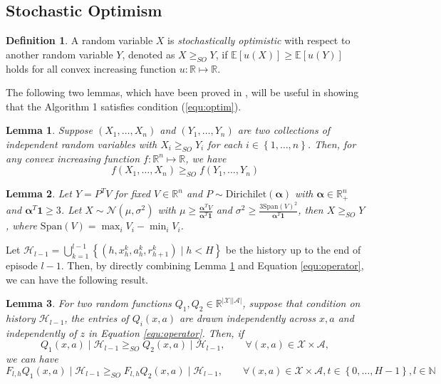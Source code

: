 \documentclass[letterpaper]{article} %
\newcommand{\Sp}[1]{\left(#1\right)}
\newcommand{\Mp}[1]{\left[#1\right]}
\newcommand{\Bp}[1]{\left\{#1\right\}}
\newcommand{\abs}[1]{\left|#1\right|}
\newcommand{\E}{\mathbb{E}}
\newcommand{\R}{\mathbb{R}}
\newtheorem{lemma}{Lemma}
\theoremstyle{definition}
\newtheorem{definition}{Definition}
\begin{document}
\subsection{Stochastic Optimism}
\begin{definition}
	A random variable $X$ is \textit{stochastically optimistic} with respect to another random variable $Y$, denoted as $X\geq_{SO}Y$, if $\E\Mp{u\Sp{X}}\geq\E\Mp{u\Sp{Y}}$ holds for all convex increasing function $u:\R\mapsto\R$.
\end{definition}

The following two lemmas, which have been proved in \cite{osband2017deep}, will be useful in showing that the Algorithm 1 satisfies condition (\ref{equ:optim}).

\begin{lemma}
	\label{lemma:conv}
	Suppose $\Sp{X_1, \dots, X_n}$ and $\Sp{Y_1, \dots, Y_n}$ are two collections of independent random variables with $X_i\geq_{SO}Y_i$ for each $i\in\Bp{1, \dots, n}$. Then, for any convex increasing function $f:\R^n\mapsto\R$, we have
	$$f\Sp{X_1, \dots, X_n}\geq_{SO} f\Sp{Y_1, \dots, Y_n}$$
\end{lemma}

\begin{lemma}
	\label{lemma:dir_so}
	Let $Y=P^TV$ for fixed $V\in\R^n$ and $P\sim\mathrm{Dirichilet}\Sp{\bm{\alpha}}$ with $\bm{\alpha}\in\R^n_{+}$ and $\bm{\alpha}^T\bm{1}\geq 3$. Let $X\sim\mathcal{N}\Sp{\mu, \sigma^2}$ with $\mu\geq\frac{\bm{\alpha}^TV}{\bm{\alpha}^T\bm{1}}$ and $\sigma^2\geq\frac{3\mathrm{Span}\Sp{V}^2}{\bm{\alpha}^T\bm{1}}$, then $X\geq_{SO} Y$, where $\mathrm{Span}\Sp{V}=\max_iV_i-\min_iV_i$.
\end{lemma}

Let $\mathcal{H}_{l-1}=\bigcup_{k=1}^{l-1}\Bp{\Sp{h, x_h^k, a_h^k, r_{h+1}^k}\mid h<H}$ be the history up to the end of episode $l-1$. Then, by directly combining Lemma \ref{lemma:conv} and Equation \ref{equ:operator}, we can have the following result.
\begin{lemma}
	\label{lemma:mono}
	For two random functions $Q_1, Q_2\in\R^{\abs{\mathcal{X}}\abs{\mathcal{A}}}$, suppose that condition on history $\mathcal{H}_{l-1}$, the entries of $Q_i\Sp{x, a}$ are drawn independently across $x, a$ and independently of $z$ in Equation \ref{equ:operator}. Then, if
	$$Q_1\Sp{x, a}\mid\mathcal{H}_{l-1}\geq_{SO}Q_2\Sp{x, a}\mid\mathcal{H}_{l-1},\qquad\forall\Sp{x, a}\in\mathcal{X}\times\mathcal{A},$$
	we can have
	$$F_{l, h}Q_1\Sp{x, a}\mid\mathcal{H}_{l-1}\geq_{SO}F_{l, h}Q_2\Sp{x, a}\mid\mathcal{H}_{l-1},\qquad\forall\Sp{x, a}\in\mathcal{X}\times\mathcal{A}, t\in\Bp{0, \dots, H-1}, l\in\mathbb{N}$$
\end{lemma}
\end{document}
